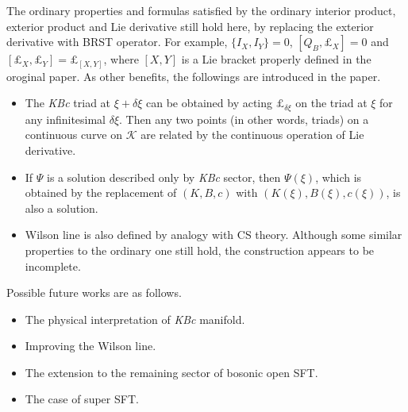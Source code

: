 \documentclass[12pt]{article}
\begin{document}
The ordinary properties and formulas satisfied by the ordinary interior product, exterior product and Lie derivative still hold here, by replacing the exterior derivative with BRST operator.
For example, $\{I_X,I_Y\} = 0$, $[Q_B,\pounds_X] = 0$ and $[\pounds_X,\pounds_Y] = \pounds_{[X,Y]}$, where $[X,Y]$ is a Lie bracket properly defined in the oroginal paper.
As other benefits, the followings are introduced in the paper.
\begin{itemize}
	\item The \textit{KBc} triad at $\xi + \delta \xi$ can be obtained by acting $\pounds_{\delta \xi}$ on the triad at $\xi$ for any infinitesimal $\delta\xi$. Then any two points (in other words, triads) on a continuous curve on $\mathcal K$ are related by the continuous operation of Lie derivative.
	\item If $\Psi$ is a solution described only by \textit{KBc} sector, then $\Psi(\xi)$, which is obtained by the replacement of $(K,B,c)$ with $(K(\xi),B(\xi),c(\xi))$, is also a solution.
	\item Wilson line is also defined by analogy with CS theory. Although some similar properties to the ordinary one still hold, the construction appears to be incomplete.
\end{itemize}
Possible future works are as follows.
\begin{itemize}
	\item The physical interpretation of \textit{KBc} manifold.
	\item Improving the Wilson line.
	\item The extension to the remaining sector of bosonic open SFT.
	\item The case of super SFT.
\end{itemize}
\end{document}
